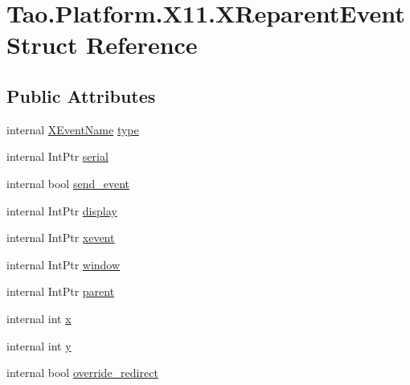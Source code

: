 \hypertarget{struct_tao_1_1_platform_1_1_x11_1_1_x_reparent_event}{
\section{Tao.Platform.X11.XReparentEvent Struct Reference}
\label{struct_tao_1_1_platform_1_1_x11_1_1_x_reparent_event}
}
\subsection*{Public Attributes}
\begin{DoxyCompactItemize}
\item 
internal \hyperlink{namespace_tao_1_1_platform_1_1_x11_aff81ed5b8778e1ea8e872861dff9f146}{XEventName} \hyperlink{struct_tao_1_1_platform_1_1_x11_1_1_x_reparent_event_a43e410d13f5363f094c099de42aaac5c}{type}
\item 
internal IntPtr \hyperlink{struct_tao_1_1_platform_1_1_x11_1_1_x_reparent_event_a0cbf2e520d9792849d1f81bfc562862a}{serial}
\item 
internal bool \hyperlink{struct_tao_1_1_platform_1_1_x11_1_1_x_reparent_event_a20d86b17ee7ac09e632fc142ebe7663e}{send\_\-event}
\item 
internal IntPtr \hyperlink{struct_tao_1_1_platform_1_1_x11_1_1_x_reparent_event_a838fa361aa318f9a3cd5c011330e52e6}{display}
\item 
internal IntPtr \hyperlink{struct_tao_1_1_platform_1_1_x11_1_1_x_reparent_event_ad0c82ef1919d98f73842b5a91acdd60f}{xevent}
\item 
internal IntPtr \hyperlink{struct_tao_1_1_platform_1_1_x11_1_1_x_reparent_event_a203fa9162f72ade6b11d8b104233f57c}{window}
\item 
internal IntPtr \hyperlink{struct_tao_1_1_platform_1_1_x11_1_1_x_reparent_event_aa2b6e20899b718f9bf5f3b36beb9ebb9}{parent}
\item 
internal int \hyperlink{struct_tao_1_1_platform_1_1_x11_1_1_x_reparent_event_af2b2b73bd0e1fc9d33b048b751a24a1b}{x}
\item 
internal int \hyperlink{struct_tao_1_1_platform_1_1_x11_1_1_x_reparent_event_ac37f328ed4a685335901a935372f9888}{y}
\item 
internal bool \hyperlink{struct_tao_1_1_platform_1_1_x11_1_1_x_reparent_event_ac56eddb0d5cbe75d709ffe57f6d9a735}{override\_\-redirect}
\end{DoxyCompactItemize}


